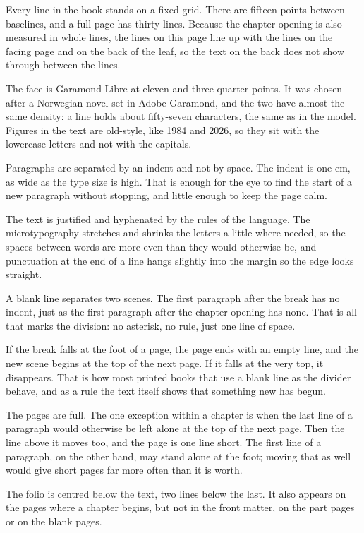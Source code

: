 \documentclass[12pt,twoside]{book}
\begin{document}
Every line in the book stands on a fixed grid. There are fifteen points between baselines, and a full page has thirty lines. Because the chapter opening is also measured in whole lines, the lines on this page line up with the lines on the facing page and on the back of the leaf, so the text on the back does not show through between the lines.

The face is Garamond Libre at eleven and three-quarter points. It was chosen after a Norwegian novel set in Adobe Garamond, and the two have almost the same density: a line holds about fifty-seven characters, the same as in the model. Figures in the text are old-style, like 1984 and 2026, so they sit with the lowercase letters and not with the capitals.

Paragraphs are separated by an indent and not by space. The indent is one em, as wide as the type size is high. That is enough for the eye to find the start of a new paragraph without stopping, and little enough to keep the page calm.

The text is justified and hyphenated by the rules of the language. The microtypography stretches and shrinks the letters a little where needed, so the spaces between words are more even than they would otherwise be, and punctuation at the end of a line hangs slightly into the margin so the edge looks straight.

\scenebreak

A blank line separates two scenes. The first paragraph after the break has no indent, just as the first paragraph after the chapter opening has none. That is all that marks the division: no asterisk, no rule, just one line of space.

If the break falls at the foot of a page, the page ends with an empty line, and the new scene begins at the top of the next page. If it falls at the very top, it disappears. That is how most printed books that use a blank line as the divider behave, and as a rule the text itself shows that something new has begun.

The pages are full. The one exception within a chapter is when the last line of a paragraph would otherwise be left alone at the top of the next page. Then the line above it moves too, and the page is one line short. The first line of a paragraph, on the other hand, may stand alone at the foot; moving that as well would give short pages far more often than it is worth.

The folio is centred below the text, two lines below the last. It also appears on the pages where a chapter begins, but not in the front matter, on the part pages or on the blank pages.
\end{document}

